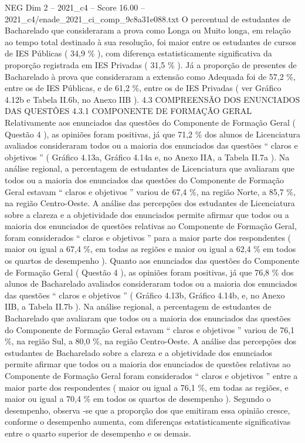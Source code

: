 \begin{textsample}{NEG Dim 2 – 2021\_c4 – Score 16.00 – 2021\_c4/enade\_2021\_ci\_comp\_9c8a31e088.txt}
O percentual de estudantes de Bacharelado que consideraram a prova como Longa ou Muito longa, em relação ao tempo total destinado à sua resolução, foi maior entre os estudantes de cursos de IES Públicas ( 34,9 \% ), com diferença estatisticamente significativa da proporção registrada em IES Privadas ( 31,5 \% ).
Já a proporção de presentes de Bacharelado à prova que consideraram a extensão como Adequada foi de 57,2 \%, entre os de IES Públicas, e de 61,2 \%, entre os de IES Privadas ( ver Gráfico 4.12b e Tabela II.6b, no Anexo IIB ). 4.3 COMPREENSÃO DOS ENUNCIADOS DAS QUESTÕES 4.3.1 COMPONENTE DE FORMAÇÃO GERAL Relativamente aos enunciados das questões do Componente de Formação Geral ( Questão 4 ), as opiniões foram positivas, já que 71,2 \% dos alunos de Licenciatura avaliados consideraram todos ou a maioria dos enunciados das questões “ claros e objetivos ” ( Gráfico 4.13a, Gráfico 4.14a e, no Anexo IIA, a Tabela II.7a ).
Na análise regional, a percentagem de estudantes de Licenciatura que avaliaram que todos ou a maioria dos enunciados das questões do Componente de Formação Geral estavam “ claros e objetivos ” variou de 67,4 \%, na região Norte, a 85,7 \%, na região Centro-Oeste.
A análise das percepções dos estudantes de Licenciatura sobre a clareza e a objetividade dos enunciados permite afirmar que todos ou a maioria dos enunciados de questões relativas ao Componente de Formação Geral, foram considerados “ claros e objetivos ” para a maior parte dos respondentes ( maior ou igual a 67,4 \%, em todas as regiões e maior ou igual a 62,4 \% em todos os quartos de desempenho ).
Quanto aos enunciados das questões do Componente de Formação Geral ( Questão 4 ), as opiniões foram positivas, já que 76,8 \% dos alunos de Bacharelado avaliados consideraram todos ou a maioria dos enunciados das questões “ claros e objetivos ” ( Gráfico 4.13b, Gráfico 4.14b, e, no Anexo IIB, a Tabela II.7b ).
Na análise regional, a percentagem de estudantes de Bacharelado que avaliaram que todos ou a maioria dos enunciados das questões do Componente de Formação Geral estavam “ claros e objetivos ” variou de 76,1 \%, na região Sul, a 80,0 \%, na região Centro-Oeste.
A análise das percepções dos estudantes de Bacharelado sobre a clareza e a objetividade dos enunciados permite afirmar que todos ou a maioria dos enunciados de questões relativas ao Componente de Formação Geral foram considerados “ claros e objetivos ” entre a maior parte dos respondentes ( maior ou igual a 76,1 \%, em todas as regiões, e maior ou igual a 70,4 \% em todos os quartos de desempenho ).
Segundo o desempenho, observa -se que a proporção dos que emitiram essa opinião cresce, conforme o desempenho aumenta, com diferenças estatisticamente significativas entre o quarto superior de desempenho e os demais.

\end{textsample}
